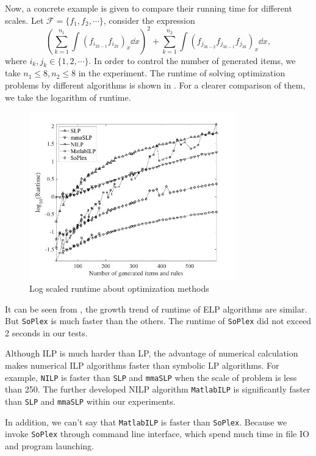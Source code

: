 Now, a concrete example is given to compare their running time for different scales. Let $\mathcal F=\{f_1,f_2,\cdots\}$, consider the expression
\begin{equation}
\left(\sum\limits_{k=1}^{n_1}{\int\!{(f_{i_{2k-1}}f_{i_{2k}})_x\dd x}}\right)^2+\sum\limits_{k=1}^{n_2}{\int\!{(f_{j_{3k-2}}f_{j_{3k-1}}f_{j_{3k}})_x\dd x}},
\end{equation}
where $i_k,j_k \in \{1,2,\cdots\}$. In order to control the number of generated items, we take $n_1\le 8,n_2\le 8$ in the experiment. The runtime of solving optimization problems by different algorithms is shown in . For a clearer comparison of them, we take the logarithm of runtime.

\begin{figure}[htb]
\centering
\includegraphics[width=0.8\textwidth]{fig/int-6.pdf}
\caption{Log scaled runtime about optimization methods}\label{opts_log}
\label{opts_all}
\end{figure}

It can be seen from , the growth trend of runtime of ELP algorithms are similar. But \texttt{SoPlex} is much faster than the others. The runtime of \texttt{SoPlex} did not exceed 2 seconds in our tests.

Although ILP is much harder than LP, the advantage of numerical calculation makes numerical ILP algorithms faster than symbolic LP algorithms. For example, \texttt{NILP} is faster than \texttt{SLP} and \texttt{mmaSLP} when the scale of problem is less than 250. The further developed NILP algorithm \texttt{MatlabILP} is significantly faster than \texttt{SLP} and \texttt{mmaSLP} within our experiments. 

In addition, we can't say that \texttt{MatlabILP} is faster than \texttt{SoPlex}. Because we invoke \texttt{SoPlex} through command line interface, which spend much time in file IO and program launching.


